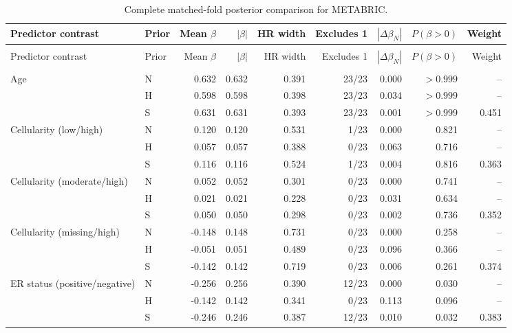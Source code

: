 \begingroup\singlespacing\footnotesize
\setlength{\tabcolsep}{3pt}
\setlength{\LTcapwidth}{\textwidth}
\begin{longtable}{@{}>{\raggedright\arraybackslash}p{}lrrrrrrr@{}}
\caption{Complete matched-fold posterior comparison for METABRIC.}\label{tab:posterior-all-metabric}\\
\toprule
Predictor contrast & Prior & Mean $\beta$ & $|\beta|$ & HR width & Excludes 1 & $|\Delta\beta_N|$ & $P(\beta>0)$ & Weight\\
\midrule\endfirsthead
\multicolumn{9}{l}{\tablename\ \thetable\ (continued)}\\
\toprule
Predictor contrast & Prior & Mean $\beta$ & $|\beta|$ & HR width & Excludes 1 & $|\Delta\beta_N|$ & $P(\beta>0)$ & Weight\\
\midrule\endhead
\midrule
\multicolumn{9}{r}{Continued on next page}\\\endfoot
\bottomrule\endlastfoot
Age & N & 0.632 & 0.632 & 0.391 & 23/23 & 0.000 & $>0.999$ & --\\*
 & H & 0.598 & 0.598 & 0.398 & 23/23 & 0.034 & $>0.999$ & --\\*
 & S & 0.631 & 0.631 & 0.393 & 23/23 & 0.001 & $>0.999$ & 0.451\\[2pt]
Cellularity (low/high) & N & 0.120 & 0.120 & 0.531 & 1/23 & 0.000 & 0.821 & --\\*
 & H & 0.057 & 0.057 & 0.388 & 0/23 & 0.063 & 0.716 & --\\*
 & S & 0.116 & 0.116 & 0.524 & 1/23 & 0.004 & 0.816 & 0.363\\[2pt]
Cellularity (moderate/high) & N & 0.052 & 0.052 & 0.301 & 0/23 & 0.000 & 0.741 & --\\*
 & H & 0.021 & 0.021 & 0.228 & 0/23 & 0.031 & 0.634 & --\\*
 & S & 0.050 & 0.050 & 0.298 & 0/23 & 0.002 & 0.736 & 0.352\\[2pt]
Cellularity (missing/high) & N & -0.148 & 0.148 & 0.731 & 0/23 & 0.000 & 0.258 & --\\*
 & H & -0.051 & 0.051 & 0.489 & 0/23 & 0.096 & 0.366 & --\\*
 & S & -0.142 & 0.142 & 0.719 & 0/23 & 0.006 & 0.261 & 0.374\\[2pt]
ER status (positive/negative) & N & -0.256 & 0.256 & 0.390 & 12/23 & 0.000 & 0.030 & --\\*
 & H & -0.142 & 0.142 & 0.341 & 0/23 & 0.113 & 0.096 & --\\*
 & S & -0.246 & 0.246 & 0.387 & 12/23 & 0.010 & 0.032 & 0.383\\[2pt]

\end{longtable}

